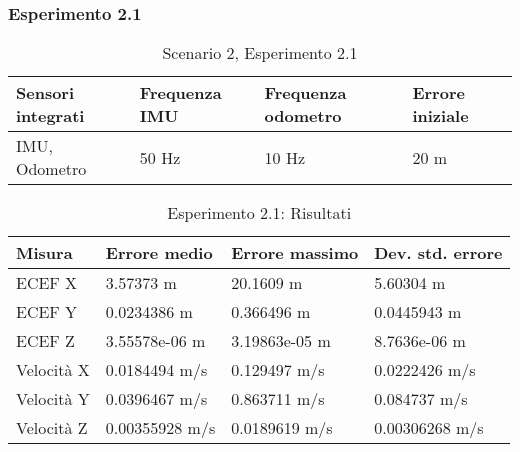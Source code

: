 \subsubsection{Esperimento 2.1}
\begin{table}[h]
	\centering
	\begin{tabular}{|p{3.2cm}|p{2.75cm}|p{2.75cm}|p{2.75cm}|}
		\hline 
		\textbf{Sensori integrati} & \textbf{Frequenza IMU}  & \textbf{Frequenza odometro} & \textbf{Errore iniziale} \\ 
		\hline 
		IMU, Odometro & 50 Hz & 10 Hz & 20 m \\ 
		\hline 
	\end{tabular}
	\caption{Scenario 2, Esperimento 2.1}
\end{table}
\begin{table}[h]
	\centering
	\begin{tabular}{|p{2cm}|p{3.2cm}|p{3cm}|p{3cm}|}
		\hline 
		\textbf{Misura} 
		& \textbf{Errore medio} 
		& \textbf{Errore massimo}
		& \textbf{Dev. std. errore}\\ 
		\hline 
		ECEF X & 3.57373 m & 20.1609 m & 5.60304 m \\ 
		\hline 
		ECEF Y & 0.0234386 m & 0.366496 m & 0.0445943 m \\ 
		\hline 
		ECEF Z & 3.55578e-06 m & 3.19863e-05 m & 8.7636e-06 m \\ 
		\hline 
		Velocit\`a X & 0.0184494 m/s & 0.129497 m/s & 0.0222426 m/s \\ 
		\hline 
		Velocit\`a Y & 0.0396467 m/s & 0.863711 m/s & 0.084737 m/s \\ 
		\hline 
		Velocit\`a Z & 0.00355928 m/s & 0.0189619 m/s & 0.00306268 m/s \\ 
		\hline 
	\end{tabular} 
	\caption{Esperimento 2.1: Risultati}
\end{table}
